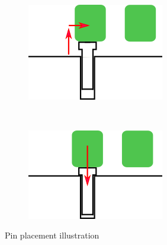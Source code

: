 \documentclass[11pt,a4paper, margin=1in]{report}
\begin{document}
\begin{figure}[h]
\begin{subfigure}{0.4\linewidth}
	\end{subfigure} \ \ \
		\begin{subfigure}{0.4\linewidth}
			\includegraphics[width=\linewidth]{pinPlace3}
		\end{subfigure} \ \ \
			\begin{subfigure}{0.4\linewidth}
				\includegraphics[width=\linewidth]{pinPlace4}
			\end{subfigure}
\caption{Pin placement illustration}
\label{fig:pinPlace2}
\end{figure}
\end{document}
